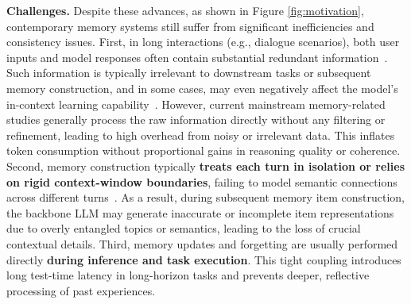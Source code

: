 \textbf{Challenges.} 
Despite these advances, as shown in Figure \ref{fig:motivation}, contemporary memory systems still suffer from significant inefficiencies and consistency issues. 
First, in long interactions (e.g., dialogue scenarios), both user inputs and model responses often contain substantial redundant information~\citep{maharana2024evaluatinglongtermconversationalmemory, DBLP:conf/iclr/WuWYZCY25}. Such information is typically irrelevant to downstream tasks or subsequent memory construction, and in some cases, may even negatively affect the model’s in-context learning capability~\citep{liu2023lostmiddlelanguagemodels, DBLP:conf/iclr/PanWJLCL0LZQ025}. However, current mainstream memory-related studies generally process the raw information directly without any filtering or refinement, leading to high overhead from noisy or irrelevant data. 
This inflates token consumption  without proportional gains in reasoning quality or coherence. 
Second, memory construction typically \textbf{treats each turn in isolation or relies on rigid context-window boundaries}, failing to model semantic connections across different turns~\citep{tan2025prospectretrospectreflectivememory}.
As a result, during subsequent memory item construction, the backbone LLM may generate inaccurate or incomplete item representations due to overly entangled topics or semantics, leading to the loss of crucial contextual details.
Third, memory updates and forgetting are usually performed directly \textbf{during inference and task execution}. 
This tight coupling introduces long test-time latency in long-horizon tasks and prevents deeper, reflective processing of past experiences.




